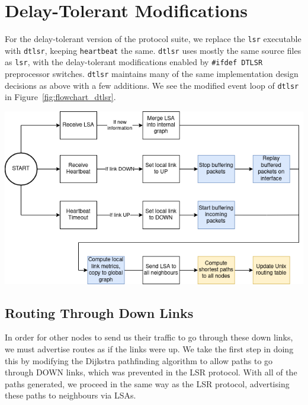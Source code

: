 \documentclass[withindex,glossary,openany]{cam-thesis}
\begin{document}
\section{Delay-Tolerant Modifications}

For the delay-tolerant version of the protocol suite, we replace the \texttt{lsr} executable with \texttt{dtlsr}, keeping \texttt{heartbeat} the same. \texttt{dtlsr} uses mostly the same source files as \texttt{lsr}, with the delay-tolerant modifications enabled by \texttt{\#ifdef DTLSR} preprocessor switches. \texttt{dtlsr} maintains many of the same implementation design decisions as above with a few additions. We see the modified event loop of \texttt{dtlsr} in Figure~\ref{fig:flowchart_dtlsr}.

\begin{center}
\begin{minipage}{0.9\textwidth} \centering
	\includegraphics[width=1\textwidth]{flowchart_dtlsr}
	\label{fig:flowchart_dtlsr}
\end{minipage}
\end{center}

\subsection{Routing Through Down Links}

In order for other nodes to send us their traffic to go through these down links, we must advertise routes as if the links were up. We take the first step in doing this by modifying the Dijkstra pathfinding algorithm to allow paths to go through DOWN links, which was prevented in the LSR protocol. With all of the paths generated, we proceed in the same way as the LSR protocol, advertising these paths to neighbours via LSAs.
\end{document}
